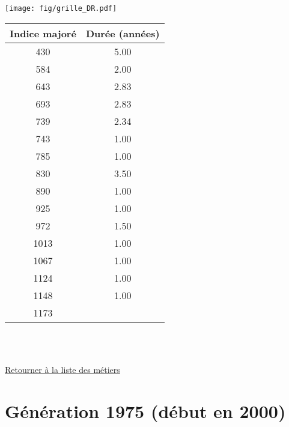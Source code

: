 \begin{minipage}{0.55\linewidth}\texttt{[image: fig/grille\_DR.pdf]}\end{minipage} 
\begin{minipage}{0.3\linewidth} 
 \begin{center} 

\begin{tabular}[htb]{|c|c|} 
\hline 
 Indice majoré &  Durée (années) \\ 
\hline \hline 
 430 &  5.00 \\ 
\hline 
 584 &  2.00 \\ 
\hline 
 643 &  2.83 \\ 
\hline 
 693 &  2.83 \\ 
\hline 
 739 &  2.34 \\ 
\hline 
 743 &  1.00 \\ 
\hline 
 785 &  1.00 \\ 
\hline 
 830 &  3.50 \\ 
\hline 
 890 &  1.00 \\ 
\hline 
 925 &  1.00 \\ 
\hline 
 972 &  1.50 \\ 
\hline 
 1013 &  1.00 \\ 
\hline 
 1067 &  1.00 \\ 
\hline 
 1124 &  1.00 \\ 
\hline 
 1148 &  1.00 \\ 
\hline 
 1173 &   \\ 
\hline 
\hline 
\end{tabular} 
\end{center} 
 \end{minipage} 

~\\ 
 


   
 \localtableofcontents 

~\\ 
 
 \hyperlink{page.2}{\noindent Retourner à la liste des métiers}

 \newpage 

\section{Génération 1975 (début en 2000)\label{DR_100_25_1975_0}} 
 
